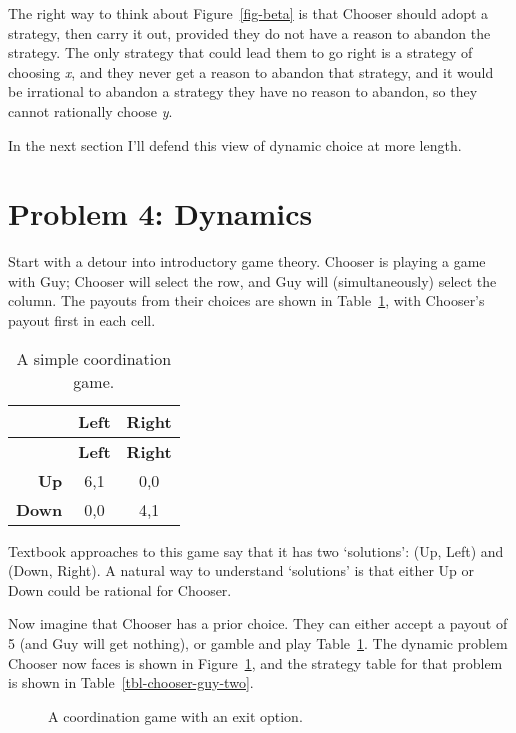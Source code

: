 \documentclass[
  10pt,
  letterpaper,
  DIV=11,
  numbers=noendperiod,
  twoside]{scrartcl}
\begin{document}
The right way to think about Figure~\ref{fig-beta} is that Chooser
should adopt a strategy, then carry it out, provided they do not have a
reason to abandon the strategy. The only strategy that could lead them
to go right is a strategy of choosing \emph{x}, and they never get a
reason to abandon that strategy, and it would be irrational to abandon a
strategy they have no reason to abandon, so they cannot rationally
choose \emph{y}.

In the next section I'll defend this view of dynamic choice at more
length.

\section{Problem 4: Dynamics}\label{sec-dynamic}

Start with a detour into introductory game theory. Chooser is playing a
game with Guy; Chooser will select the row, and Guy will
(simultaneously) select the column. The payouts from their choices are
shown in Table~\ref{tbl-chooser-guy}, with Chooser's payout first in
each cell.

\begin{longtable}[]{@{}rcc@{}}
\caption{A simple coordination
game.}\label{tbl-chooser-guy}\tabularnewline
\toprule\noalign{}
& \textbf{Left} & \textbf{Right} \\
\midrule\noalign{}
\endfirsthead
\toprule\noalign{}
& \textbf{Left} & \textbf{Right} \\
\midrule\noalign{}
\endhead
\bottomrule\noalign{}
\endlastfoot
\textbf{Up} & 6,1 & 0,0 \\
\textbf{Down} & 0,0 & 4,1 \\
\end{longtable}

Textbook approaches to this game say that it has two `solutions': (Up,
Left) and (Down, Right). A natural way to understand `solutions' is that
either Up or Down could be rational for Chooser.

Now imagine that Chooser has a prior choice. They can either accept a
payout of 5 (and Guy will get nothing), or gamble and play
Table~\ref{tbl-chooser-guy}. The dynamic problem Chooser now faces is
shown in Figure~\ref{fig-chooser-guy-two}, and the strategy table for
that problem is shown in Table~\ref{tbl-chooser-guy-two}.

\begin{figure}


\caption{\label{fig-chooser-guy-two}A coordination game with an exit
option.}

\end{figure}%
\end{document}
